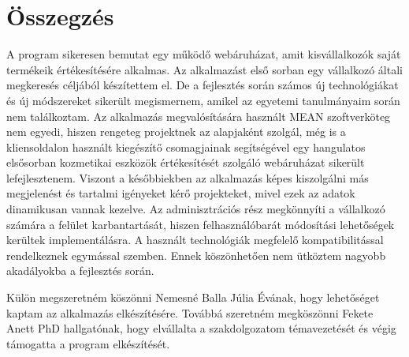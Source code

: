\chapter{Összegzés} %
\label{ch:sum}

A program sikeresen bemutat egy működő webáruházat, amit kisvállalkozók saját termékeik értékesítésére alkalmas. Az alkalmazást első sorban egy vállalkozó általi megkeresés céljából készítettem el. De a fejlesztés során számos új technológiákat és új módszereket sikerült megismernem, amikel az egyetemi tanulmányaim során nem találkoztam. Az alkalmazás megvalósítására használt MEAN szoftverköteg nem egyedi, hiszen rengeteg projektnek az alapjaként szolgál, még is a kliensoldalon használt kiegészítő csomagjainak segítségével egy hangulatos elsősorban kozmetikai eszközök értékesítését szolgáló webáruházat sikerült lefejlesztenem. Viszont a későbbiekben az alkalmazás képes kiszolgálni más megjelenést és tartalmi igényeket kérő projekteket, mivel ezek az adatok dinamikusan vannak kezelve. Az adminisztrációs rész megkönnyíti a vállalkozó számára a felület karbantartását, hiszen felhasználóbarát módosítási lehetőségek kerültek implementálásra. A használt technológiák megfelelő kompatibilitással rendelkeznek egymással szemben. Ennek köszönhetően nem ütköztem nagyobb akadályokba a fejlesztés során.

\bigskip
Külön megszeretném köszönni Nemesné Balla Júlia Évának, hogy lehetőséget kaptam az alkalmazás elkészítésére. Továbbá szeretném megköszönni Fekete Anett PhD hallgatónak, hogy elvállalta a szakdolgozatom témavezetését és végig támogatta a program elkészítését.